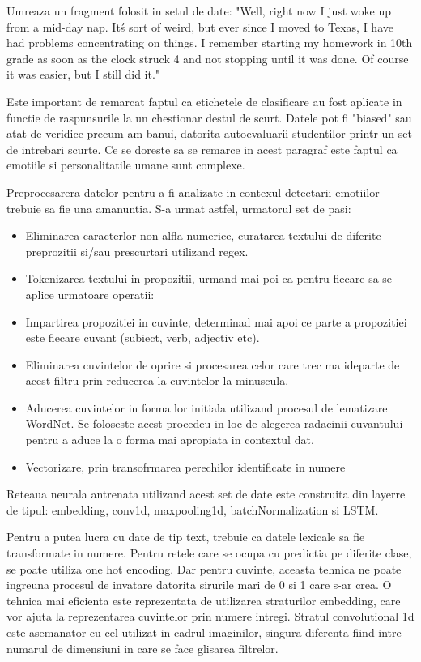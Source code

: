 \documentclass[a4paper, 12pt]{report}
\begin{document}
	Umreaza un fragment folosit in setul de date: "Well, right now I just woke up from a mid-day nap. It\'s sort of weird, but ever since I moved to Texas, I have had problems concentrating on things. I remember starting my homework in  10th grade as soon as the clock struck 4 and not stopping until it was done. Of course it was easier, but I still did it."

	Este important de remarcat faptul ca etichetele de clasificare au fost aplicate in functie de raspunsurile la un chestionar destul de scurt. Datele pot fi "biased" sau atat de veridice precum am banui, datorita autoevaluarii studentilor printr-un set de intrebari scurte. Ce se doreste sa se remarce in acest paragraf este faptul ca emotiile si personalitatile umane sunt complexe.
	
	Preprocesarera datelor pentru a fi analizate in contexul detectarii emotiilor trebuie sa fie una amanuntia. S-a urmat astfel, urmatorul set de pasi:
	\begin{itemize}
		\item Eliminarea caracterlor non alfla-numerice, curatarea textului de diferite preprozitii si/sau prescurtari utilizand regex.
		\item Tokenizarea textului in propozitii, urmand mai poi ca pentru fiecare sa se aplice urmatoare operatii:
		\item Impartirea propozitiei in cuvinte, determinad mai apoi ce parte a propozitiei este fiecare cuvant (subiect, verb, adjectiv etc).
		\item Eliminarea cuvintelor de oprire si procesarea celor care trec ma ideparte de acest filtru prin reducerea la cuvintelor la minuscula.
		\item Aducerea cuvintelor in forma lor initiala utilizand procesul de lematizare WordNet. Se foloseste acest procedeu in loc de alegerea radacinii cuvantului pentru a aduce la o forma mai apropiata in contextul dat.
		\item Vectorizare, prin transofrmarea perechilor identificate in numere
	\end{itemize}
	
	\bigskip
	
	Reteaua neurala antrenata utilizand acest set de date este construita din layerre de tipul: embedding, conv1d, maxpooling1d, batchNormalization si LSTM.
	
	Pentru a putea lucra cu date de tip text, trebuie ca datele lexicale sa fie transformate in numere. Pentru retele care se ocupa cu predictia pe diferite clase, se poate utiliza one hot encoding. Dar pentru cuvinte, aceasta tehnica ne poate ingreuna procesul de invatare datorita sirurile mari de 0 si 1 care s-ar crea. O tehnica mai eficienta este reprezentata de utilizarea straturilor embedding, care vor ajuta la reprezentarea cuvintelor prin numere intregi. Stratul convolutional 1d este asemanator cu cel utilizat in cadrul imaginilor, singura diferenta fiind intre numarul de dimensiuni in care se face glisarea filtrelor.
	
\end{document}
